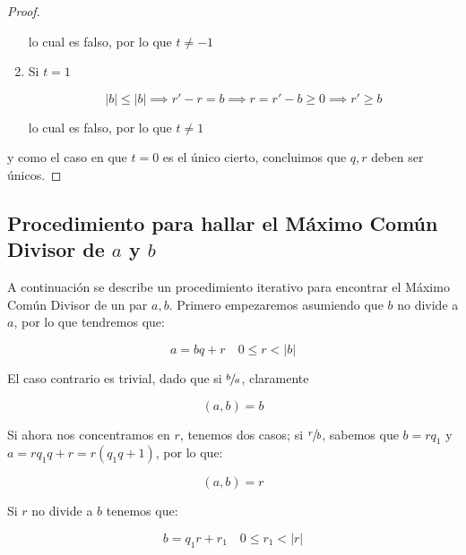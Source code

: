 \begin{proof}
\begin{enumerate}
                lo cual es falso, por lo que $t \ne -1$

                \item Si $t = 1$

                \begin{equation*}
                    |b| \leq |b| \implies r' - r = b \implies r = r' - b \geq 0 \implies r' \geq b
                \end{equation*}

                lo cual es falso, por lo que $t \ne 1$
            \end{enumerate}

            y como el caso en que $t = 0$ es el único cierto, concluimos que $q, r$ deben ser únicos.
        \end{proof}
    \newpage
    \subsection{Procedimiento para hallar el Máximo Común Divisor de $a$ y $b$}

        A continuación se describe un procedimiento iterativo para encontrar el Máximo Común Divisor de un par $a, b$.
        Primero empezaremos asumiendo que $b$ no divide a $a$, por lo que tendremos que:

        \begin{equation} \label{eq:mcd1}
            a = bq + r \quad 0 \leq r < |b|
        \end{equation}

        El caso contrario es trivial, dado que si $\sfrac{b}{a}$, claramente

        \begin{equation*}
            (a, b) = b
        \end{equation*}

        Si ahora nos concentramos en $r$, tenemos dos casos; si $\sfrac{r}{b}$, sabemos que $b = r q_1$ y $a = r q_1 q + r = r(q_1 q + 1)$, por lo que:

        \begin{equation*}
            (a, b) = r
        \end{equation*}

        Si $r$ no divide a $b$ tenemos que:

        \begin{equation} \label{eq:mcd2}
            b = q_1 r + r_1 \quad 0 \leq r_1 < |r|
        \end{equation}

